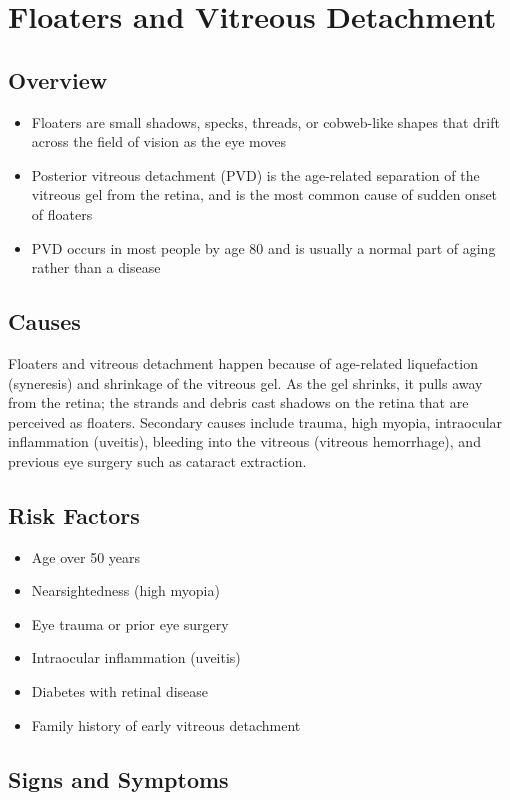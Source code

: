 \chapter{Floaters and Vitreous Detachment}
\label{sec:Floaters and Vitreous Detachment}

\section{Overview}
\begin{itemize}[noitemsep]
  \item Floaters are small shadows, specks, threads, or cobweb-like shapes that drift across the field of vision as the eye moves
  \item Posterior vitreous detachment (PVD) is the age-related separation of the vitreous gel from the retina, and is the most common cause of sudden onset of floaters
  \item PVD occurs in most people by age 80 and is usually a normal part of aging rather than a disease
\end{itemize}
\section{Causes}
Floaters and vitreous detachment happen because of age-related liquefaction (syneresis) and shrinkage of the vitreous gel. As the gel shrinks, it pulls away from the retina; the strands and debris cast shadows on the retina that are perceived as floaters. Secondary causes include trauma, high myopia, intraocular inflammation (uveitis), bleeding into the vitreous (vitreous hemorrhage), and previous eye surgery such as cataract extraction.
\section{Risk Factors}
\begin{itemize}[noitemsep]
  \item Age over 50 years
  \item Nearsightedness (high myopia)
  \item Eye trauma or prior eye surgery
  \item Intraocular inflammation (uveitis)
  \item Diabetes with retinal disease
  \item Family history of early vitreous detachment
\end{itemize}
\section{Signs and Symptoms}
